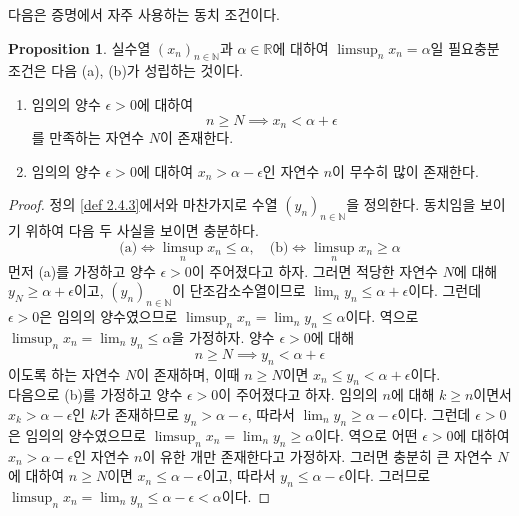 \documentclass[11pt]{book}
\numberwithin{equation}{chapter}
\def\NN{\mathbb{N}}
\def\RR{\mathbb{R}}
\def\eps{\epsilon}
\theoremstyle{definition}
\newtheorem{prop}[thm]{Proposition}
\begin{document}
다음은 증명에서 자주 사용하는 동치 조건이다.
    \begin{prop} \label{prop 2.4.6}
        실수열 \((x_n)_{n \in \NN}\)과 \(\alpha \in \RR\)에 대하여 \(\limsup_{n} x_n = \alpha\)일 필요충분조건은 다음 (a), (b)가 성립하는 것이다.
            \begin{enumerate} [label=(\alph*), leftmargin=2\parindent]
                \item 임의의 양수 \(\eps > 0\)에 대하여
                \[
                n \ge N \implies x_n < \alpha + \eps    
                \]
                를 만족하는 자연수 \(N\)이 존재한다.
                \item 임의의 양수 \(\eps > 0\)에 대하여 \(x_n > \alpha - \eps\)인 자연수 \(n\)이 무수히 많이 존재한다.
            \end{enumerate}
    \end{prop}
    \begin{proof}
        정의 \ref{def 2.4.3}에서와 마찬가지로 수열 \((y_n)_{n \in \NN}\)을 정의한다. 동치임을 보이기 위하여 다음 두 사실을 보이면 충분하다.
        \[
        \text{(a)} \iff \limsup_{n} x_n \le \alpha, \quad \text{(b)} \iff \limsup_{n} x_n \ge \alpha 
        \]
        먼저 (a)를 가정하고 양수 \(\eps > 0\)이 주어졌다고 하자. 그러면 적당한 자연수 \(N\)에 대해 \(y_N \ge \alpha + \eps\)이고, \((y_n)_{n \in \NN}\)이 단조감소수열이므로 \(\lim_{n} y_n \le \alpha + \eps\)이다. 그런데 \(\eps > 0\)은 임의의 양수였으므로 \(\limsup_n x_n = \lim_{n} y_n \le \alpha\)이다. 역으로 \(\limsup_{n} x_n = \lim_n y_n \le \alpha\)을 가정하자. 양수 \(\eps > 0\)에 대해
        \[
        n \ge N \implies y_n < \alpha + \eps    
        \]
        이도록 하는 자연수 \(N\)이 존재하며, 이때 \(n \ge N\)이면 \(x_n \le y_n < \alpha + \eps\)이다.\\
        다음으로 (b)를 가정하고 양수 \(\eps > 0\)이 주어졌다고 하자. 임의의 \(n\)에 대해 \(k \ge n\)이면서 \(x_k > \alpha - \eps\)인 \(k\)가 존재하므로 \(y_n > \alpha - \eps\), 따라서 \(\lim_{n} y_n \ge \alpha - \eps\)이다. 그런데 \(\eps > 0\)은 임의의 양수였으므로 \(\limsup_n x_n = \lim_{n} y_n \ge \alpha\)이다. 역으로 어떤 \(\eps > 0\)에 대하여 \(x_n > \alpha - \eps\)인 자연수 \(n\)이 유한 개만 존재한다고 가정하자. 그러면 충분히 큰 자연수 \(N\)에 대하여 \(n \ge N\)이면 \(x_n \le \alpha - \eps\)이고, 따라서 \(y_n \le \alpha - \eps\)이다. 그러므로 \(\limsup_{n} x_n = \lim_n y_n \le \alpha - \eps < \alpha\)이다.
    \end{proof}
\end{document}

